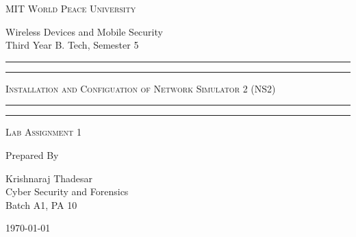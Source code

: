 \documentclass[11pt]{article}
\begin{document}
\begin{titlepage}
    \centering


    \huge\textsc{
        MIT World Peace University
    }\\

    \vspace{0.75\baselineskip} %

    \LARGE{
        Wireless Devices and Mobile Security\\
        Third Year B. Tech, Semester 5
    }

    \vfill %


    \rule{\textwidth}{1.6pt}\vspace*{-\baselineskip}\vspace*{2pt}
    \rule{\textwidth}{0.6pt}
    \vspace{0.75\baselineskip} %



    \huge{\textsc{
            Installation and Configuation of Network Simulator 2 (NS2)
        }} \\



    \vspace{0.5\baselineskip} %
    \rule{\textwidth}{0.6pt}\vspace*{-\baselineskip}\vspace*{2.8pt}
    \rule{\textwidth}{1.6pt}

    \vspace{1\baselineskip} %


    \LARGE\textsc{
        Lab Assignment 1
    } %
    \vfill


    Prepared By
    \vspace{0.5\baselineskip} %

    \Large{
        Krishnaraj Thadesar \\
        Cyber Security and Forensics\\
        Batch A1, PA 10
    }


    \vspace{0.5\baselineskip} %
    \today

\end{titlepage}
\end{document}
